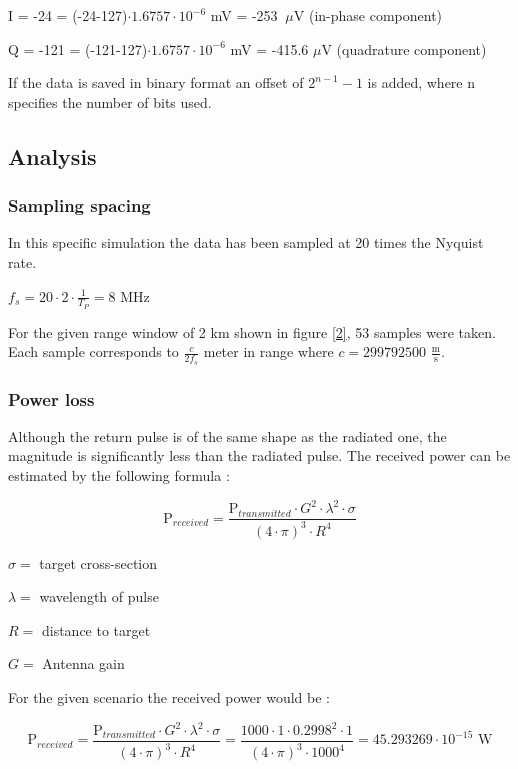 \documentclass[thmsa,a4paper,ukenglish]{report}
\begin{document}
I = -24 = (-24-127)$\cdot 1.6757\cdot 10^{-6}$ mV = -253 $\ \mu $V (in-phase
component)

Q = -121 = (-121-127)$\cdot 1.6757\cdot 10^{-6}$ mV = -415.6 $\mu $V
(quadrature component)

If the data is saved in binary format an offset of $2^{n-1}-1$ is added,
where n specifies the number of bits used.

\subsection{Analysis}

\subsubsection{Sampling spacing}

In this specific simulation the data has been sampled at 20 times the
Nyquist rate.

$f_{s}=20\cdot 2\cdot \frac{1}{T_{P}}=8$ MHz

For the given range window of 2 km shown in figure \ref{2}, 53 samples were
taken. Each sample corresponds to $\frac{c}{2f_{s}}$ meter in range where $%
c=299792500$ $\frac{\text{m}}{\text{s}}$.

\subsubsection{\protect\smallskip Power loss}

\smallskip Although the return pulse is of the same shape as the radiated
one, the magnitude is significantly less than the radiated pulse. The
received power can be estimated by the following formula :

\[
\text{P}_{received}=\frac{\text{P}_{transmitted}\cdot G^{2}\cdot \lambda
^{2}\cdot \sigma }{(4\cdot \pi )^{3}\cdot R^{4}} 
\]

$\sigma =$ target cross-section

$\lambda =$ wavelength of pulse

$R=$ distance to target

$G=$ Antenna gain

For the given scenario the received power would be :

\[
\text{P}_{received}=\frac{\text{P}_{transmitted}\cdot G^{2}\cdot \lambda
^{2}\cdot \sigma }{(4\cdot \pi )^{3}\cdot R^{4}}=\frac{1000\cdot 1\cdot
0.2998^{2}\cdot 1}{(4\cdot \pi )^{3}\cdot 1000^{4}}=45.293269\cdot 10^{-15}%
\text{ W} 
\]
\end{document}
